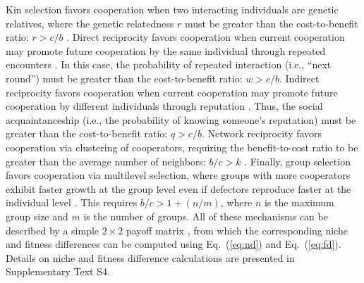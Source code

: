 \documentclass[12pt]{article}
\newcommand{\eref}[1]{Eq.~(\ref{eq:#1})}
\begin{document}
Kin selection favors cooperation when two interacting individuals are genetic relatives, where the genetic relatedness $r$ must be greater than the cost-to-benefit ratio: $r > c/b$ \citep{hamilton1964genetical}.
Direct reciprocity favors cooperation when current cooperation may promote future cooperation by the same individual through repeated encounters \citep{trivers1971evolution,axelrod1981evolution}.
In this case, the probability of repeated interaction (i.e., ``next round'') must be greater than the cost-to-benefit ratio: $w > c/b$.
Indirect reciprocity favors cooperation when current cooperation may promote future cooperation by different individuals through reputation \citep{nowak1998evolution,wedekind2000cooperation,nowak2005evolution}.
Thus, the social acquaintanceship (i.e., the probability of knowing someone’s reputation) must be greater than the cost-to-benefit ratio: $q > c/b$.
Network reciprocity favors cooperation via clustering of cooperators, requiring the benefit-to-cost ratio to be greater than the average number of neighbors: $b/c > k$ \citep{nowak1992evolutionary,lieberman2005evolutionary}.
Finally, group selection favors cooperation via multilevel selection, where groups with more cooperators exhibit faster growth at the group level even if defectors reproduce faster at the individual level \citep{traulsen2006evolution}.
This requires $b/c > 1 + (n/m)$, where $n$ is the maximum group size and $m$ is the number of groups.
All of these mechanisms can be described by a simple $2\times 2$ payoff matrix \citep{nowak2006five}, from which the corresponding niche and fitness differences can be computed using \eref{nd} and \eref{fd}.
Details on niche and fitness difference calculations are presented in Supplementary Text S4.
\end{document}
